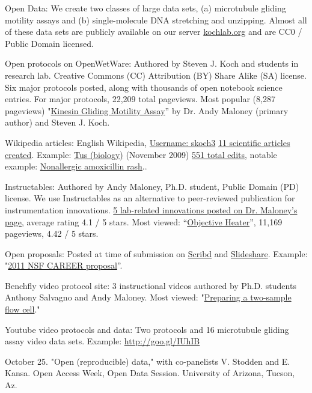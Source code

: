 \documentclass[11pt]{article}
\begin{document}
\ind Open Data: We create two classes of large data sets, (a) microtubule gliding motility assays and (b) single-molecule DNA stretching and unzipping.  Almost all of these data sets are publicly available on our server \href{http://goo.gl/5MlVY}{kochlab.org} and are CC0 / Public Domain licensed. 

\ind Open protocols on OpenWetWare: Authored by Steven J. Koch and students in research lab. Creative Commons (CC) Attribution (BY) Share Alike (SA) license. Six major protocols posted, along with thousands of open notebook science entries.  For major protocols, 22,209 total pageviews.  Most popular (8,287 pageviews) "\href{http://goo.gl/nGmJb}{Kinesin Gliding Motility Assay}” by Dr. Andy Maloney (primary author) and Steven J. Koch.  

\ind Wikipedia articles: English Wikipedia, \href{http://goo.gl/Uz9MS}{Username: skoch3} \href{http://goo.gl/MZROA}{11 scientific articles created}. Example: \href{http://goo.gl/Tgr5u}{Tus (biology)} (November 2009) \href{http://goo.gl/oroi1}{551 total edits}, notable example: \href{http://goo.gl/qYkHt}{Nonallergic amoxicillin rash}.. 

\ind Instructables: Authored by Andy Maloney, Ph.D. student, Public Domain (PD) license. We use Instructables as an alternative to peer-reviewed publication for instrumentation innovations.  \href{http://goo.gl/sVvZs}{5 lab-related innovations posted on Dr. Maloney’s page}, average rating 4.1 / 5 stars.  Most viewed: “\href{http://goo.gl/oOgjZ}{Objective Heater}”, 11,169 pageviews, 4.42 / 5 stars.

\ind Open proposals: Posted at time of submission on \href{http://goo.gl/Xhv1C}{Scribd} and \href{http://goo.gl/zeLJW}{Slideshare}. Example: "\href{http://goo.gl/nQ20k}{2011 NSF CAREER proposal}”. 

\ind Benchfly video protocol site: 3 instructional videos authored by Ph.D. students Anthony Salvagno and Andy Maloney.  Most viewed: "\href{http://goo.gl/tHkob}{Preparing a two-sample flow cell}."

\ind Youtube video protocols and data: Two protocols and 16 microtubule gliding assay video data sets.  Example: \href{http://goo.gl/IUhIB}{http://goo.gl/IUhIB}  

\medskip

 October 25. "Open (reproducible) data," with co-panelists V. Stodden and E. Kansa. Open Access Week, Open Data Session.  University of Arizona, Tucson, Az.
\end{document}
